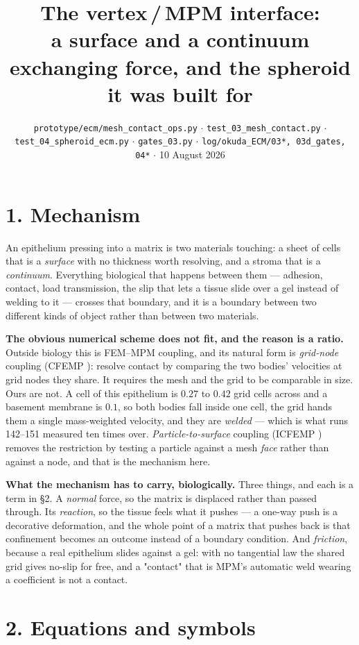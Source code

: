 \documentclass[10pt,a4paper]{article}
\title{\vspace{-1.4cm}\textbf{The vertex\,/\,MPM interface:\\
\normalsize a surface and a continuum exchanging force, and the spheroid it was built for}}
\author{}
\date{\vspace{-0.9cm}\small \texttt{prototype/ecm/mesh\_contact\_ops.py} $\cdot$
\texttt{test\_03\_mesh\_contact.py} $\cdot$ \texttt{test\_04\_spheroid\_ecm.py} $\cdot$
\texttt{gates\_03.py} $\cdot$
\texttt{log/okuda\_ECM/03*, 03d\_gates, 04*} $\cdot$ 10 August 2026}
\begin{document}
\maketitle\vspace{-1.0cm}

\section*{1.\; Mechanism}

An epithelium pressing into a matrix is two materials touching: a sheet of cells that is a
\emph{surface} with no thickness worth resolving, and a stroma that is a \emph{continuum}. Everything
biological that happens between them --- adhesion, contact, load transmission, the slip that lets a
tissue slide over a gel instead of welding to it --- crosses that boundary, and it is a boundary
between two different kinds of object rather than between two materials.

\textbf{The obvious numerical scheme does not fit, and the reason is a ratio.} Outside biology this is
FEM--MPM coupling, and its natural form is \emph{grid-node} coupling (CFEMP \cite{lian2011}): resolve
contact by comparing the two bodies' velocities at grid nodes they share. It requires the mesh and the
grid to be comparable in size. Ours are not. A cell of this epithelium is $0.27$ to $0.42$ grid cells
across and a basement membrane is $0.1$, so both bodies fall inside one cell, the grid hands them a
single mass-weighted velocity, and they are \emph{welded} --- which is what runs 142--151 measured ten
times over. \emph{Particle-to-surface} coupling (ICFEMP \cite{chen2015}) removes the restriction by
testing a particle against a mesh \emph{face} rather than against a node, and that is the mechanism
here.

\textbf{What the mechanism has to carry, biologically.} Three things, and each is a term in \S2. A
\emph{normal} force, so the matrix is displaced rather than passed through. Its \emph{reaction}, so the
tissue feels what it pushes --- a one-way push is a decorative deformation, and the whole point of a
matrix that pushes back is that confinement becomes an outcome instead of a boundary condition.
And \emph{friction}, because a real epithelium slides against a gel: with no tangential law the shared
grid gives no-slip for free, and a "contact" that is MPM's automatic weld wearing a coefficient is not
a contact.

\section*{2.\; Equations and symbols}
\end{document}
